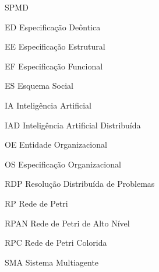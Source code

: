 \begin{listofabbrv}{SPMD}
  \item[ED] Especificação Deôntica
  \item[EE] Especificação Estrutural
  \item[EF] Especificação Funcional
  \item[ES] Esquema Social
  \item[IA] Inteligência Artificial
  \item[IAD] Inteligência Artificial Distribuída
  \item[OE] Entidade Organizacional
  \item[OS] Especificação Organizacional
  \item[RDP] Resolução Distribuída de Problemas
  \item[RP] Rede de Petri
  \item[RPAN] Rede de Petri de Alto Nível
  \item[RPC] Rede de Petri Colorida
  \item[SMA] Sistema Multiagente
\end{listofabbrv}